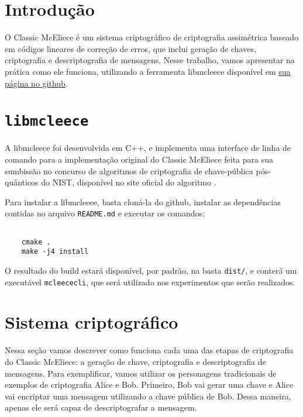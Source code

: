 \section{Introdução}

O Classic McEliece é um sistema criptográfico de criptografia assimétrica baseado em códigos lineares de correção de erros, que inclui geração de chaves, criptografia e descriptografia de mensagens. Nesse trabalho, vamos apresentar na prática como ele funciona, utilizando a ferramenta libmcleece disponível em \href{https://github.com/sz3/libmcleece}{sua página no github}.

\section{\texttt{libmcleece}}

A libmcleece foi desenvolvida em C++, e implementa uma interface de linha de comando para a implementação original do Classic McEliece feita para sua sumbissão no concurso de algoritmos de criptografia de chave-pública pós-quânticos do NIST, disponível no site oficial do algoritmo \cite{ClassicMcEliece}.

Para instalar a libmcleece, basta cloná-la do github, instalar as dependências contidas no arquivo \texttt{README.md} e executar os comandos:

\begin{verbatim}

    cmake .
    make -j4 install

\end{verbatim}

O resultado do build estará disponível, por padrão, na basta \texttt{dist/}, e conterá um executável \texttt{mcleececli}, que será utilizado nos experimentos que serão realizados.

\section{Sistema criptográfico}

Nessa seção vamos descrever como funciona cada uma das etapas de criptografia do Classic McEliece: a geração de chave, criptografia e descriptografia de mensagens. Para exemplificar, vamos utilizar os personagens tradicionais de exemplos de criptografia Alice e Bob. Primeiro, Bob vai gerar uma chave e Alice vai encriptar uma mensagem utilizando a chave pública de Bob. Dessa maneira, apenas ele será capaz de descriptografar a mensagem.

